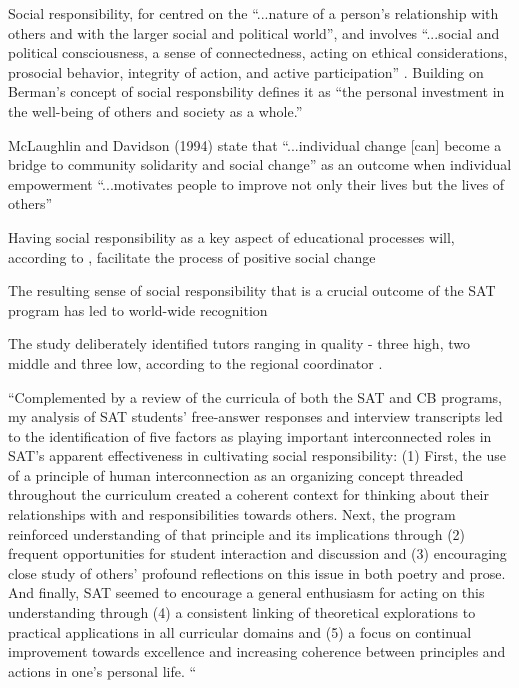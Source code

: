 Social responsibility, for \citep[][]{Berman1997} centred on the “...nature of a person’s relationship with others and with the larger social and political world”, and involves “...social and political consciousness, a sense of connectedness, acting on ethical considerations, prosocial behavior, integrity of action, and active participation” \citep[][p12-14]{Berman1997}. Building on Berman’s concept of social responsbility \citet[][p600]{Honeyman2010} defines it as “the personal investment in the well-being of others and society as a whole.”

McLaughlin and Davidson (1994) state that “...individual change [can] become a bridge to community solidarity and social change” as an outcome when individual empowerment “...motivates people to improve not only their lives but the lives of others” \citep{Honeyman2010} %

Having social responsibility as a key aspect of educational processes will, according to \citet{Honeyman2010}, facilitate the process of positive social change 

The resulting sense of social responsibility that is a crucial outcome of the SAT program has led to world-wide recognition \citep{Honeyman2010}

The study deliberately identified tutors ranging in quality - three high, two middle and three low, according to the regional coordinator \citep{Honeyman2010}.

“Complemented by a review of the curricula of both the SAT and CB programs, my analysis of SAT students’ free-answer responses and interview transcripts led to the identification of five factors as playing important interconnected roles in SAT’s apparent effectiveness in cultivating social responsibility: (1) First, the use of a principle of human interconnection as an organizing concept threaded throughout the curriculum created a coherent context for thinking about their relationships with and responsibilities towards others. Next, the program reinforced understanding of that principle and its implications through (2) frequent opportunities for student interaction and discussion and (3) encouraging close study of others’ profound reflections on this issue in both poetry and prose. And finally, SAT seemed to encourage a general enthusiasm for acting on this understanding through (4) a consistent linking of theoretical explorations to practical applications in all curricular domains and (5) a focus on continual improvement towards excellence and increasing coherence between principles and actions in one’s personal life. “ \citep{Honeyman2010} %

